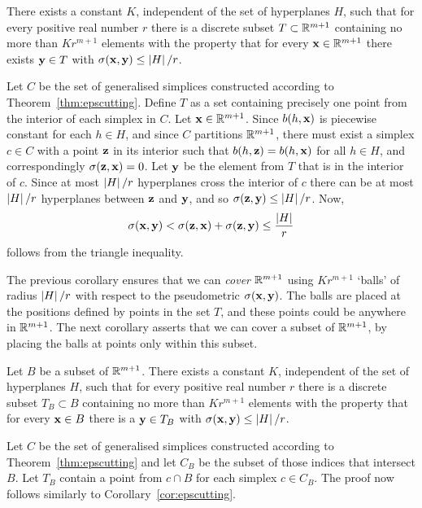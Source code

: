 \documentclass[journal]{IEEEtran}
\begin{document}
\begin{corollary}\label{cor:epscutting}
There exists a constant $K$, independent of the set of hyperplanes $H$, such that for every positive real number $r$ there is a discrete subset $T \subset {\mathbb R}^{m+1}$ containing no more than $K r^{m+1}$ elements with the property that for every $\mathbf{x} \in {\mathbb R}^{m+1}$ there exists $\mathbf{y} \in T$ with $\sigma(\mathbf{x}, \mathbf{y}) \leq \left\vert H \right\vert/r$.
\end{corollary}
\begin{IEEEproof}
Let $C$ be the set of generalised simplices constructed according to Theorem~\ref{thm:epscutting}.  Define $T$ as a set containing precisely one point from the interior of each simplex in $C$.  Let $\mathbf{x} \in {\mathbb R}^{m+1}$.  Since $b(h, \mathbf{x})$ is piecewise constant for each $h \in H$, and since $C$ partitions ${\mathbb R}^{m+1}$, there must exist a simplex $c \in C$ with a point $\mathbf{z}$ in its interior such that $b(h,\mathbf{z}) = b(h, \mathbf{x})$ for all $h \in H$, and correspondingly $\sigma(\mathbf{z}, \mathbf{x}) = 0$.  Let $\mathbf{y}$ be the element from $T$ that is in the interior of $c$.  Since at most $\left\vert H \right\vert/r$ hyperplanes cross the interior of $c$ there can be at most $\left\vert H \right\vert/r$ hyperplanes between $\mathbf{z}$ and $\mathbf{y}$, and so $\sigma(\mathbf{z}, \mathbf{y}) \leq \left\vert H \right\vert/r$.  Now, 
\[
\sigma(\mathbf{x}, \mathbf{y}) < \sigma(\mathbf{z}, \mathbf{x}) + \sigma(\mathbf{z}, \mathbf{y}) \leq \frac{\left\vert H \right\vert}{r}
\]
follows from the triangle inequality.
\end{IEEEproof}

The previous corollary ensures that we can \emph{cover} ${\mathbb R}^{m+1}$ using $K r^{m+1}$ `balls' of radius $\left\vert H \right\vert/r$ with respect to the pseudometric $\sigma(\mathbf{x}, \mathbf{y})$.  The balls are placed at the positions defined by points in the set $T$, and these points could be anywhere in ${\mathbb R}^{m+1}$.  The next corollary asserts that we can cover a subset of ${\mathbb R}^{m+1}$, by placing the balls at points only within this subset.

\begin{corollary}\label{cor:epscuttingsubset}
Let $B$ be a subset of ${\mathbb R}^{m+1}$.  There exists a constant $K$, independent of the set of hyperplanes $H$, such that for every positive real number $r$ there is a discrete subset $T_B \subset B$ containing no more than $K r^{m+1}$ elements with the property that for every $\mathbf{x} \in B$ there is a $\mathbf{y} \in T_B$ with $\sigma(\mathbf{x}, \mathbf{y}) \leq \left\vert H \right\vert/r$.
\end{corollary}
\begin{IEEEproof}
Let $C$ be the set of generalised simplices constructed according to Theorem~\ref{thm:epscutting} and let $C_B$ be the subset of those indices that intersect $B$.  Let $T_B$ contain a point from $c \cap B$ for each simplex $c \in C_B$.  The proof now follows similarly to Corollary~\ref{cor:epscutting}.
\end{IEEEproof}
\end{document}
